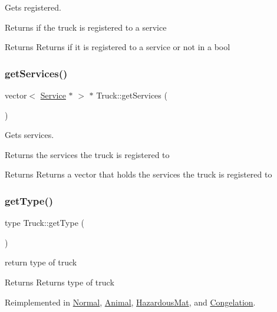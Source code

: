 Gets registered. 

Returns if the truck is registered to a service

\begin{DoxyReturn}{Returns}
Returns if it is registered to a service or not in a bool 
\end{DoxyReturn}
\mbox{\label{class_truck_a207506f38e78d7a5f065893295a2c00d}} 
\subsubsection{\texorpdfstring{get\+Services()}{getServices()}}
{\footnotesize\ttfamily vector$<$ \hyperlink{class_service}{Service} $\ast$ $>$ $\ast$ Truck\+::get\+Services (\begin{DoxyParamCaption}{ }\end{DoxyParamCaption})}



Gets services. 

Returns the services the truck is registered to

\begin{DoxyReturn}{Returns}
Returns a vector that holds the services the truck is registered to 
\end{DoxyReturn}
\mbox{\label{class_truck_a24406caf4d09be7f3eff069ce6bc015b}} 
\subsubsection{\texorpdfstring{get\+Type()}{getType()}}
{\footnotesize\ttfamily type Truck\+::get\+Type (\begin{DoxyParamCaption}{ }\end{DoxyParamCaption})\hspace{0.3cm}{\ttfamily [virtual]}}



return type of truck 

\begin{DoxyReturn}{Returns}
Returns type of truck 
\end{DoxyReturn}


Reimplemented in \hyperlink{class_normal_ae34be8332ea67df5fb0ae9b274884748}{Normal}, \hyperlink{class_animal_a6e7f8a4a7e8e9571218e3650a0803c03}{Animal}, \hyperlink{class_hazardous_mat_aed587121cdff185be91ad9ec5ba4d380}{Hazardous\+Mat}, and \hyperlink{class_congelation_a5026bd6791faeae03fbf1ad84f9bbc08}{Congelation}.

